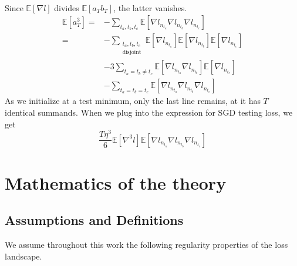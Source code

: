 \documentclass[anon,12pt]{colt2021} %
\newcommand{\expct}[1]{\mathbb{E}\left[#1\right]}
\begin{document}
\begin{shaded}
\begin{align*}
                \end{align*}
                Since $\expct{\nabla l}$ divides $\expct{a_T b_T}$, the latter
                vanishes.
                \begin{align*}
                    \expct{a_T^3}
                        =&- \sum_{t_a, t_b, t_c}
                                \expct{\nabla l_{n_{t_a}} \nabla l_{n_{t_b}} \nabla l_{n_{t_c}}}
                        \\
                        =&- \sum_{\substack{t_a, t_b, t_c\\ \text{disjoint}}}  
                                \expct{\nabla l_{n_{t_a}}} \expct{\nabla l_{n_{t_b}}} \expct{\nabla l_{n_{t_c}}}
                        \\&-3 \sum_{t_a=t_b\neq t_c}  
                                \expct{\nabla l_{n_{t_a}} \nabla l_{n_{t_b}}} \expct{\nabla l_{n_{t_c}}}
                        \\&-\sum_{t_a=t_b=t_c}  
                                \expct{\nabla l_{n_{t_a}} \nabla l_{n_{t_b}} \nabla l_{n_{t_c}}}
                \end{align*}
                As we initialize at a test minimum, only the last line remains, at
                it has $T$ identical summands.
                When we plug into the expression for SGD testing loss, we get
                $$
                    \frac{T \eta^3 }{6}
                    \expct{\nabla^3 l}
                    \expct{\nabla l_{n_{t_a}} \nabla l_{n_{t_b}} \nabla l_{n_{t_c}}}
                $$
            \end{shaded}




\newpage
\section{Mathematics of the theory}\label{appendix:math}
    \subsection{Assumptions and Definitions}                        \label{appendix:assumptions}
        We assume throughout this work the following regularity properties of
        the loss landscape.
        
\end{document}
